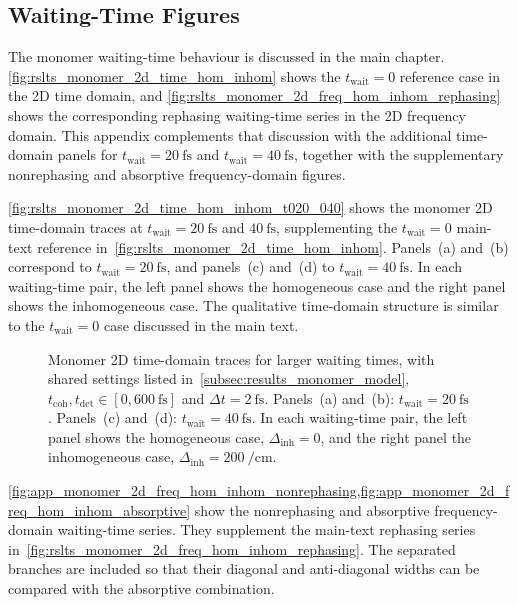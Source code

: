 \subsection{Waiting-Time Figures}

The monomer waiting-time behaviour is discussed in the main chapter.
\autoref{fig:rslts_monomer_2d_time_hom_inhom} shows the \(t_{\mathrm{wait}}=0\)
reference case in the 2D time domain, and
\autoref{fig:rslts_monomer_2d_freq_hom_inhom_rephasing} shows the corresponding
rephasing waiting-time series in the 2D frequency domain. This appendix
complements that discussion with the additional time-domain panels for
\(t_{\mathrm{wait}}=\SI{20}{\femto\second}\) and
\(t_{\mathrm{wait}}=\SI{40}{\femto\second}\), together with the supplementary
nonrephasing and absorptive frequency-domain figures.

\autoref{fig:rslts_monomer_2d_time_hom_inhom_t020_040} shows the monomer 2D
time-domain traces at
\(t_{\mathrm{wait}}=\SI{20}{\femto\second}\) and
\(\SI{40}{\femto\second}\), supplementing the \(t_{\mathrm{wait}}=0\) main-text
reference in~\autoref{fig:rslts_monomer_2d_time_hom_inhom}. Panels~(a) and~(b)
correspond to \(t_{\mathrm{wait}}=\SI{20}{\femto\second}\), and panels~(c)
and~(d) to \(t_{\mathrm{wait}}=\SI{40}{\femto\second}\). In each waiting-time
pair, the left panel shows the homogeneous case and the right panel shows the
inhomogeneous case. The qualitative time-domain structure is similar to the
\(t_{\mathrm{wait}}=0\) case discussed in the main text.

\begin{figure}[htbp]
    \centering
    \caption{Monomer 2D time-domain traces for larger waiting times, with
    shared settings listed in~\autoref{subsec:results_monomer_model},
    \(t_{\mathrm{coh}},t_{\mathrm{det}}\in[0,\SI{600}{\femto\second}]\) and
    \(\Delta t=\SI{2}{\femto\second}\). Panels~(a) and~(b):
    \(t_{\mathrm{wait}}=\SI{20}{\femto\second}\). Panels~(c) and~(d):
    \(t_{\mathrm{wait}}=\SI{40}{\femto\second}\). In each waiting-time pair,
    the left panel shows the homogeneous case, \(\Delta_{\mathrm{inh}}=0\), and
    the right panel the inhomogeneous case,
    \(\Delta_{\mathrm{inh}}=\SI{200}{\per\centi\metre}\).}
    \label{fig:rslts_monomer_2d_time_hom_inhom_t020_040}
\end{figure}

\cref{fig:app_monomer_2d_freq_hom_inhom_nonrephasing,fig:app_monomer_2d_freq_hom_inhom_absorptive}
show the nonrephasing and absorptive frequency-domain waiting-time series. They
supplement the main-text rephasing series
in~\autoref{fig:rslts_monomer_2d_freq_hom_inhom_rephasing}. The separated
branches are included so that their diagonal and anti-diagonal widths can be
compared with the absorptive combination.


